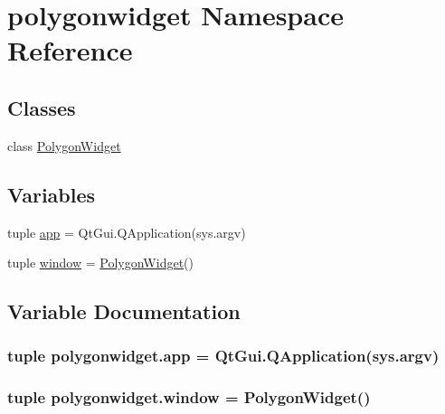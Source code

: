 \hypertarget{namespacepolygonwidget}{}\section{polygonwidget Namespace Reference}
\label{namespacepolygonwidget}
\subsection*{Classes}
\begin{DoxyCompactItemize}
\item 
class \hyperlink{classpolygonwidget_1_1PolygonWidget}{Polygon\+Widget}
\end{DoxyCompactItemize}
\subsection*{Variables}
\begin{DoxyCompactItemize}
\item 
tuple \hyperlink{namespacepolygonwidget_af1a3f585212a8f7bd5fe1521ff2b951e}{app} = Qt\+Gui.\+Q\+Application(sys.\+argv)
\item 
tuple \hyperlink{namespacepolygonwidget_a5b95efb7db0153324ba42af98cfe9daf}{window} = \hyperlink{classpolygonwidget_1_1PolygonWidget}{Polygon\+Widget}()
\end{DoxyCompactItemize}


\subsection{Variable Documentation}
\hypertarget{namespacepolygonwidget_af1a3f585212a8f7bd5fe1521ff2b951e}{}
\subsubsection[{app}]{\setlength{\rightskip}{0pt plus 5cm}tuple polygonwidget.\+app = Qt\+Gui.\+Q\+Application(sys.\+argv)}\label{namespacepolygonwidget_af1a3f585212a8f7bd5fe1521ff2b951e}
\hypertarget{namespacepolygonwidget_a5b95efb7db0153324ba42af98cfe9daf}{}
\subsubsection[{window}]{\setlength{\rightskip}{0pt plus 5cm}tuple polygonwidget.\+window = {\bf Polygon\+Widget}()}\label{namespacepolygonwidget_a5b95efb7db0153324ba42af98cfe9daf}
